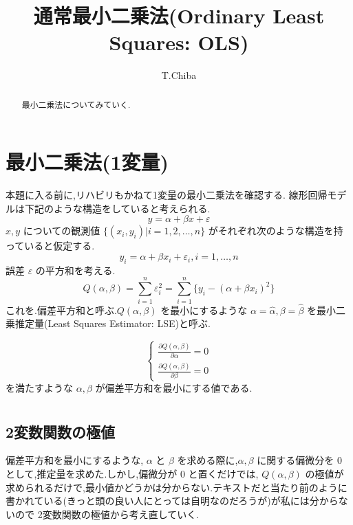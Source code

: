 \documentclass{jsarticle}
\title{通常最小二乗法(Ordinary Least Squares: OLS)}
\author{T.Chiba}
\theoremstyle{plain}
\begin{document}
  \maketitle
  \begin{abstract}
    最小二乗法についてみていく.
  \end{abstract}
  \section{最小二乗法(1変量)}
    本題に入る前に,リハビリもかねて1変量の最小二乗法を確認する.
    線形回帰モデルは下記のような構造をしていると考えられる.
  \begin{equation}
    y = \alpha + \beta x + \varepsilon
  \end{equation}
    $x, y$ についての観測値 $\{(x_i, y_i) | i = 1,2,\ldots,n\}$ がそれぞれ次のような構造を持っていると仮定する.
  \begin{equation}
    y_i = \alpha + \beta x_i + \varepsilon_i, i = 1,\ldots,n
  \end{equation}
  誤差 $\varepsilon$ の平方和を考える.
  \begin{equation}
    Q(\alpha, \beta) = \sum_{i=1}^n \varepsilon_i^2 = \sum_{i=1}^n \{y_i - (\alpha + \beta x_i)^2 \}
  \end{equation}
  これを.偏差平方和と呼ぶ.$Q(\alpha, \beta)$ を最小にするような $\alpha = \hat{\alpha}, \beta = \hat{\beta}$ を最小二乗推定量(Least Squares Estimator: LSE)と呼ぶ.

  \begin{equation}
    \begin{cases}
      \frac{\partial Q(\alpha, \beta)}{\partial \alpha} = 0 \\
      \frac{\partial Q(\alpha, \beta)}{\partial \beta} = 0
    \end{cases}
  \end{equation}
  を満たすような $\alpha, \beta$ が偏差平方和を最小にする値である.
  
  \appendix
  \section{}
  \subsection{2変数関数の極値}
  偏差平方和を最小にするような, $\alpha$ と $\beta$ を求める際に,$\alpha, \beta$ に関する偏微分を $0$ として,推定量を求めた.しかし,偏微分が $0$ と置くだけでは,
  $Q(\alpha, \beta)$ の極値が求められるだけで,最小値かどうかは分からない.テキストだと当たり前のように書かれている(きっと頭の良い人にとっては自明なのだろうが)が私には分からないので
  2変数関数の極値から考え直していく.
\end{document}
